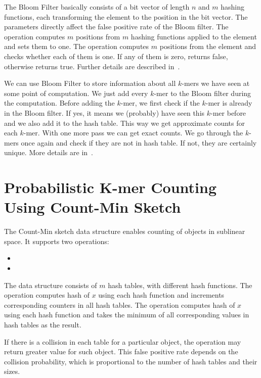 The Bloom Filter basically consists of a bit vector of length $n$ and $m$ hashing functions, each transforming the element to the position in the bit vector. The parameters directly affect the false positive rate of the Bloom filter.
The  operation computes $m$ positions from $m$ hashing functions applied to the element and sets them to one.
The  operation computes $m$ positions from the element and checks whether each of them is one. If any of them is zero, returns false, otherwise returns true. Further details are described in~\cite{bloomfilter}.

We can use Bloom Filter to store information about all $k$-mers we have seen at some point of computation. We just add every $k$-mer to the Bloom filter during the computation. Before adding the $k$-mer, we first check if the $k$-mer is already in the Bloom filter. If yes, it means we (probably) have seen this $k$-mer before and we also add it to the hash table. This way we get approximate counts for each $k$-mer.
With one more pass we can get exact counts. We go through the $k$-mers once again and check if they are not in hash table. If not, they are certainly unique. More details are in~\cite{bfcounter}.

\section{Probabilistic K-mer Counting Using Count-Min Sketch}

The Count-Min sketch\cite{countminsketch} data structure enables counting of objects in sublinear space. It supports two operations:
\begin{itemize}
  \item {} %
  \item {} %
\end{itemize}

The data structure consists of $m$ hash tables, with different hash functions.
The  operation computes hash of $x$ using each hash function and increments corresponding counters in all hash tables. The  operation computes hash of $x$ using each hash function and takes the minimum of all corresponding values in hash tables as the result. %

If there is a collision in each table for a particular object, the  operation may return greater value for such object. This false positive rate depends on the collision probability, which is proportional to the number of hash tables and their sizes.

